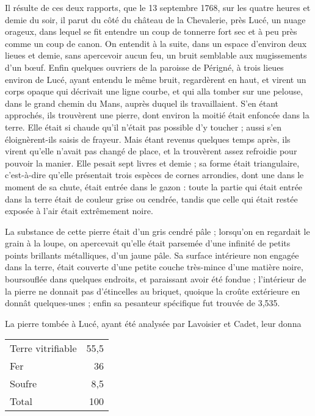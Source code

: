 \documentclass[a4paper, 12pt, oneside, french]{article}
\begin{document}
Il résulte de ces deux rapports, que le 13 septembre 1768, sur les quatre heures et demie du soir, il parut du côté du château de la Chevalerie, près Lucé, un nuage orageux, dans lequel se fit entendre un coup de tonnerre fort sec et à peu près comme un coup de canon. On entendit à la suite, dans un espace d'environ deux lieues et demie, sans apercevoir aucun feu, un bruit semblable aux mugissements d'un bœuf. Enfin quelques ouvriers de la paroisse de Périgné, à trois lieues environ de Lucé, ayant entendu le même bruit, regardèrent en haut, et virent un corps opaque qui décrivait une ligne courbe, et qui alla tomber sur une pelouse, dans le grand chemin du Mans, auprès duquel ils travaillaient. S'en étant approchés, ils trouvèrent une pierre, dont environ la moitié était enfoncée dans la terre. Elle était si chaude qu'il n'était pas possible d'y toucher ; aussi s'en éloignèrent-ils saisis de frayeur. Mais étant revenus quelques temps après, ils virent qu'elle n'avait pas changé de place, et la trouvèrent assez refroidie pour pouvoir la manier. Elle pesait sept livres et demie ; sa forme était triangulaire, c'est-à-dire qu'elle présentait trois espèces de cornes arrondies, dont une dans le moment de sa chute, était entrée dans le gazon : toute la partie qui était entrée dans la terre était de couleur grise ou cendrée, tandis que celle qui était restée exposée à l'air était extrêmement noire.

La substance de cette pierre était d'un gris cendré pâle ; lorsqu'on en regardait le grain à la loupe, on apercevait qu'elle était parsemée d'une infinité de petits points brillants métalliques, d'un jaune pâle. Sa surface intérieure non engagée dans la terre, était couverte d'une petite couche très-mince d'une matière noire, boursouflée dans quelques endroits, et paraissant avoir été fondue ; l'intérieur de la pierre ne donnait pas d'étincelles au briquet, quoique la croûte extérieure en donnât quelques-unes ; enfin sa pesanteur spécifique fut trouvée de 3,535.

La pierre tombée à Lucé, ayant été analysée par Lavoisier et Cadet, leur donna
\begin{table}[H]
    \centering
    \begin{tabular}{l r}
        Terre vitrifiable & 55,5 \\
        Fer & 36 \\
        Soufre & 8,5 \\ \hline
        Total & 100 \\
    \end{tabular}
\end{table}
\end{document}
